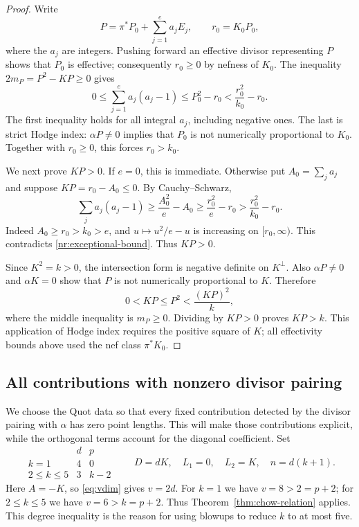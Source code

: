 \begin{proof}
Write
\[
 P=\pi^*P_0+\sum_{j=1}^e a_jE_j,
 \qquad r_0=K_0P_0,
\]
where the $a_j$ are integers.  Pushing forward an effective divisor
representing $P$ shows that $P_0$ is effective; consequently
$r_0\geq0$ by nefness of $K_0$.
The inequality $2m_P=P^2-KP\geq0$ gives
\begin{equation}\label{nr:exceptional-bound}
 0\leq\sum_{j=1}^e a_j(a_j-1)
 \leq P_0^2-r_0
 <\frac{r_0^2}{k_0}-r_0.
\end{equation}
The first inequality holds for all integral $a_j$, including negative
ones.  The last is strict Hodge index: $\alpha P\ne0$ implies that
$P_0$ is not numerically proportional to $K_0$.  Together with
$r_0\geq0$, this forces $r_0>k_0$.

We next prove $KP>0$.  If $e=0$, this is immediate.  Otherwise put
$A_0=\sum_j a_j$ and suppose $KP=r_0-A_0\leq0$.  By Cauchy--Schwarz,
\[
 \sum_j a_j(a_j-1)
 \geq\frac{A_0^2}{e}-A_0
 \geq\frac{r_0^2}{e}-r_0
 >\frac{r_0^2}{k_0}-r_0.
\]
Indeed $A_0\geq r_0>k_0>e$, and $u\mapsto u^2/e-u$ is increasing
on $[r_0,\infty)$.  This contradicts
\eqref{nr:exceptional-bound}.  Thus $KP>0$.

Since $K^2=k>0$, the intersection form is negative definite on
$K^\perp$.  Also $\alpha P\ne0$ and $\alpha K=0$ show that $P$
is not numerically proportional to $K$.  Therefore
\[
 0<KP\leq P^2<\frac{(KP)^2}{k},
\]
where the middle inequality is $m_P\geq0$.  Dividing by $KP>0$
proves $KP>k$.  This application of Hodge index requires the positive
square of $K$; all effectivity bounds above used the nef class $\pi^*K_0$.
\end{proof}

\subsection{All contributions with nonzero divisor pairing}

We choose the Quot data so that every fixed contribution detected by
the divisor pairing with \(\alpha\) has zero point lengths. This will
make those contributions explicit, while the orthogonal terms account
for the diagonal coefficient. Set
\begin{equation}\label{nr:data}
 \begin{array}{c|cc}
  &d&p\\\hline
  k=1&4&0\\
  2\leq k\leq5&3&k-2
 \end{array}
 \qquad
 D=dK,\quad L_1=0,\quad L_2=K,\quad n=d(k+1).
\end{equation}
Here $A=-K$, so \eqref{eq:vdim} gives $v=2d$.
For $k=1$ we have $v=8>2=p+2$; for $2\leq k\leq5$ we have
$v=6>k=p+2$.  Thus Theorem~\ref{thm:chow-relation} applies.
This degree inequality is the reason for using blowups to reduce $k$
to at most five.

